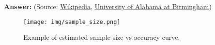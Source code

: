 \documentclass{article}
\newenvironment{QandA}{\begin{enumerate}[label=\arabic*.]}{\end{enumerate}}
\newenvironment{answer}{\par\normalfont \textbf{Answer:}}{}
\begin{document}
\begin{QandA}
\begin{answer}
        (Source: \href{https://en.wikipedia.org/wiki/Sample_complexity#Sample-complexity_bounds}{Wikipedia}, \href{https://sites.uab.edu/periop-datascience/2021/06/28/sample-size-in-machine-learning-and-artificial-intelligence/}{University of Alabama at Birmingham})
    \end{answer}

    \begin{figure}[htb!]
        \centering
        \texttt{[image: img/sample\_size.png]}
        \caption{Example of estimated sample size vs accuracy curve. \footnotemark }
        \label{fig:sample_size}
    \end{figure}



\end{QandA}
\end{document}
